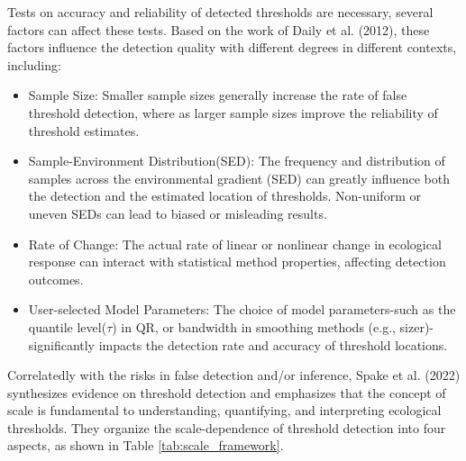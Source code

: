 Tests on accuracy and reliability of detected thresholds are necessary, several factors can affect these tests.
Based on the work of Daily et al. (2012)\cite{Daily2012}, these factors influence the detection quality with different degrees
in different contexts, including: 
\begin{itemize}
    \item Sample Size: Smaller sample sizes generally increase the rate of false threshold detection, where as 
    larger sample sizes improve the reliability of threshold estimates.
    \item Sample-Environment Distribution(SED): The frequency and distribution of samples across the 
    environmental gradient (SED) can greatly influence both the detection and the estimated location 
    of thresholds. Non-uniform or uneven SEDs can lead to biased or misleading results.
    \item Rate of Change: The actual rate of linear or nonlinear change in ecological response can interact 
    with statistical method properties, affecting detection outcomes.
    \item User-selected Model Parameters: The choice of model parameters-such as the quantile level(\(\tau\)) in QR, or 
    bandwidth in smoothing methods (e.g., sizer)-significantly impacts the detection rate and accuracy of threshold locations.
\end{itemize}

Correlatedly with the risks in false detection and/or inference, Spake et al. (2022)\cite{Spake2022} synthesizes evidence 
on threshold detection and emphasizes that the concept of scale is fundamental to understanding, quantifying, and interpreting ecological thresholds.
They organize the scale-dependence of threshold detection into four aspects, as shown in Table \ref{tab:scale_framework}.

